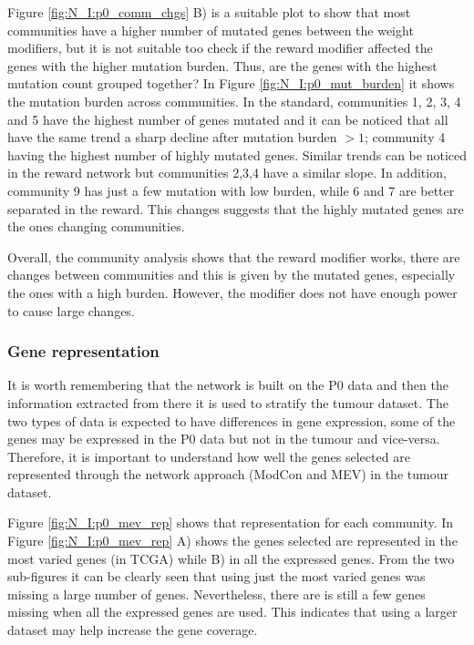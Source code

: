 % 
Figure \ref{fig:N_I:p0_comm_chgs} B) is a suitable plot to show that most communities have a higher number of mutated genes between the weight modifiers, but it is not suitable too check if the reward modifier affected the genes with the higher mutation burden. Thus, are the genes with the highest mutation count grouped together? In Figure \ref{fig:N_I:p0_mut_burden} it shows the mutation burden across communities. In the standard, communities 1, 2, 3, 4 and 5 have the highest number of genes mutated and it can be noticed that all have the same trend a sharp decline after mutation burden $>1$; community 4 having the highest number of highly mutated genes. Similar trends can be noticed in the reward network but communities 2,3,4 have a similar slope. In addition, community 9 has just a few mutation with low burden, while 6 and 7 are better separated in the reward. This changes suggests that the highly mutated genes are the ones changing communities.


Overall, the community analysis shows that the reward modifier works, there are changes between communities and this is given by the mutated genes, especially the ones with a high burden. However, the modifier does not have enough power to cause large changes.

\subsubsection{Gene representation}

It is worth remembering that the network is built on the P0 data and then the information extracted from there it is used to stratify the tumour dataset. The two types of data is expected to have differences in gene expression, some of the genes may be expressed in the P0 data but not in the tumour and vice-versa. Therefore, it is important to understand how well the genes selected are represented through the network approach (ModCon and MEV) in the tumour dataset. 


Figure \ref{fig:N_I:p0_mev_rep} shows that representation for each community. In Figure \ref{fig:N_I:p0_mev_rep} A) shows the genes selected are represented in the most varied genes (in TCGA) while B) in all the expressed genes. From the two sub-figures it can be clearly seen that using just the most varied genes was missing a large number of genes. Nevertheless, there are is still a few genes missing when all the expressed genes are used. This indicates that using a larger dataset may help increase the gene coverage. 


